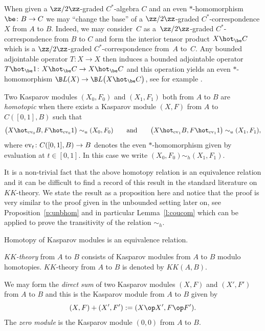 When given a $\zz/2\zz$-graded $C^*$-algebra $C$ and an even $*$-homomorphism $\be\colon B \to C$ we may ``change the base'' of a $\zz/2\zz$-graded $C^*$-correspondence $X$ from $A$ to $B$. Indeed, we may consider~$C$ as a~$\zz/2\zz$-graded $C^*$-correspondence from $B$ to $C$ and form the interior tensor product $X \hot_{\be} C$ which is a $\zz/2\zz$-graded $C^*$-correspondence from~$A$ to~$C$. Any bounded adjointable operator $T\colon X \to X$ then induces a bounded adjointable operator $T \hot_{\be} 1\colon X \hot_{\be} C \to X \hot_{\be} C$ and this operation yields an even $*$-homomorphism $\B L(X) \to \B L\big(X \hot_{\be} C\big)$, see for example \cite[Chapter~4]{Lan:HCM}.

\begin{dfn}Two Kasparov modules $(X_0,F_0)$ and $(X_1,F_1)$ both from $A$ to $B$ are \emph{homotopic} when there exists a Kasparov module $(X,F)$ from $A$ to $C([0,1],B)$ such that
\[
\big(X \hot_{{\rm ev}_0} B,F \hot_{{\rm ev}_0} 1\big) \sim_u (X_0,F_0) \qquad \mbox{and} \qquad \big(X \hot_{{\rm ev}_1} B,F \hot_{{\rm ev}_1} 1\big) \sim_u (X_1,F_1) ,
\]
where ${\rm ev}_t\colon C( [0,1],B) \to B$ denotes the even $*$-homomorphism given by evaluation at $t \in [0,1]$. In this case we write $(X_0,F_0) \sim_h (X_1,F_1)$.
\end{dfn}

It is a non-trivial fact that the above homotopy relation is an equivalence relation and it can be difficult to find a record of this result in the standard literature on $KK$-theory. We state the result as a proposition here and notice that the proof is very similar to the proof given in the unbounded setting later on, see Proposition~\ref{p:unbhom} and in particular Lemma~\ref{l:coucom} which can be applied to prove the transitivity of the relation $\sim_h$.

\begin{prop}Homotopy of Kasparov modules is an equivalence relation.
\end{prop}

\begin{dfn}\emph{$KK$-theory} from $A$ to $B$ consists of Kasparov modules from $A$ to $B$ modulo homotopies. $KK$-theory from $A$ to $B$ is denoted by $KK(A,B)$.
\end{dfn}

We may form the \emph{direct sum} of two Kasparov modules $(X,F)$ and $(X',F')$ from $A$ to $B$ and this is the Kasparov module from $A$ to $B$ given by
\[
(X,F) + (X',F') := (X \op X', F \op F') .
\]
The \emph{zero module} is the Kasparov module $(0,0)$ from $A$ to $B$.

